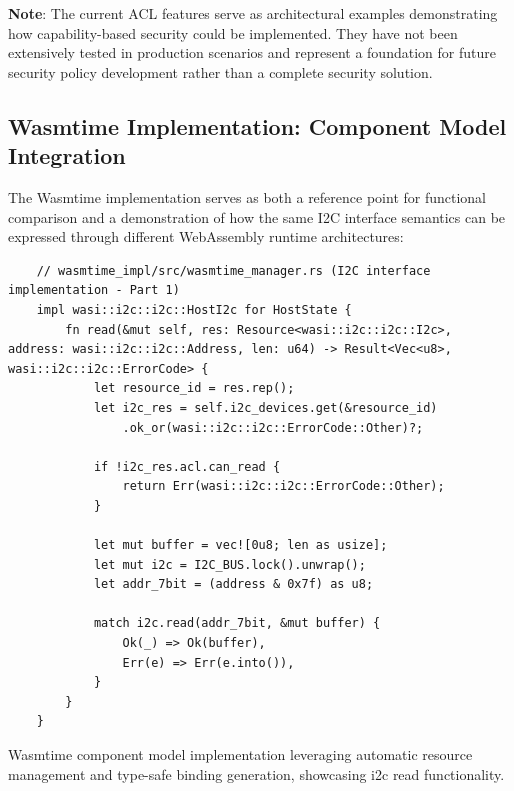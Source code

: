 \textbf{Note}: The current ACL features serve as architectural examples demonstrating how capability-based security could be implemented. They have not been extensively tested in production scenarios and represent a foundation for future security policy development rather than a complete security solution.

\subsection{Wasmtime Implementation: Component Model Integration}

The Wasmtime implementation serves as both a reference point for functional comparison and a demonstration of how the same I2C interface semantics can be expressed through different WebAssembly runtime architectures:

\begin{listing}[H]
    \begin{verbatim}
    // wasmtime_impl/src/wasmtime_manager.rs (I2C interface implementation - Part 1)
    impl wasi::i2c::i2c::HostI2c for HostState {
        fn read(&mut self, res: Resource<wasi::i2c::i2c::I2c>, address: wasi::i2c::i2c::Address, len: u64) -> Result<Vec<u8>, wasi::i2c::i2c::ErrorCode> {
            let resource_id = res.rep();
            let i2c_res = self.i2c_devices.get(&resource_id)
                .ok_or(wasi::i2c::i2c::ErrorCode::Other)?;
    
            if !i2c_res.acl.can_read {
                return Err(wasi::i2c::i2c::ErrorCode::Other);
            }
    
            let mut buffer = vec![0u8; len as usize];
            let mut i2c = I2C_BUS.lock().unwrap();
            let addr_7bit = (address & 0x7f) as u8;
    
            match i2c.read(addr_7bit, &mut buffer) {
                Ok(_) => Ok(buffer),
                Err(e) => Err(e.into()),
            }
        }
    }
    \end{verbatim}
    \caption{Wasmtime component model implementation leveraging automatic resource management and type-safe binding generation, showcasing \acrshort{i2c} read functionality.}
    \label{lst:wasmtime-implementation}
\end{listing}


